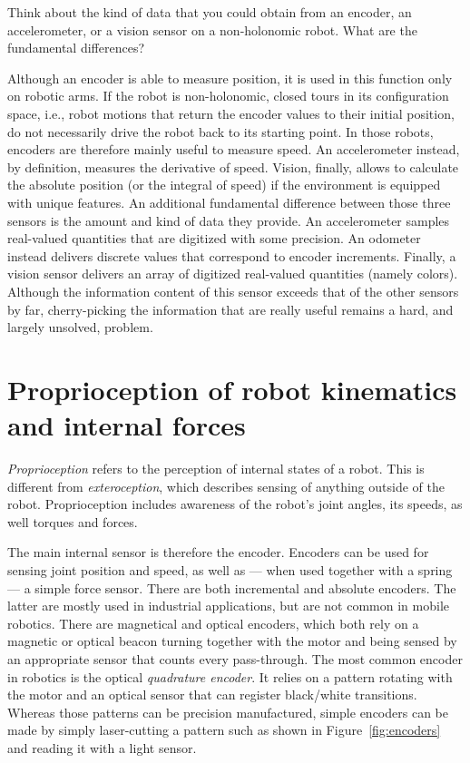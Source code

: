 \begin{framed}
Think about the kind of data that you could obtain from an encoder, an accelerometer, or a vision sensor on a non-holonomic robot. What are the fundamental differences?
\end{framed}
Although an encoder is able to measure position, it is used in this function only on robotic arms. If the robot is non-holonomic, closed tours in its configuration space, i.e., robot motions that return the encoder values to their initial position, do not necessarily drive the robot back to its starting point. In those robots, encoders are therefore mainly useful to measure speed. An accelerometer instead, by definition, measures the derivative of speed. Vision, finally, allows to calculate the absolute position (or the integral of speed) if the environment is equipped with unique features. An additional fundamental difference between those three sensors is the amount and kind of data they provide. An accelerometer samples real-valued quantities that are digitized with some precision. An odometer instead delivers discrete values that correspond to encoder increments. Finally, a vision sensor delivers an array of digitized real-valued quantities (namely colors). Although the information content of this sensor exceeds that of the other sensors by far, cherry-picking the information that are really useful remains a hard, and largely unsolved, problem.


\section{Proprioception of robot kinematics and internal forces}\label{sec:sensors:encoders}
\emph{Proprioception}  refers to the perception of internal states of a robot.
This is different from \emph{exteroception}, which describes sensing of anything outside of the robot. Proprioception includes awareness of the robot's joint angles, its speeds, as well torques and forces.

The main internal sensor is therefore the encoder. Encoders can be used for sensing joint position and speed, as well as --- when used together with a spring --- a simple force sensor. There are both incremental and absolute encoders. The latter are mostly used in industrial applications, but are not common in mobile robotics. There are magnetical and optical encoders, which both rely on a magnetic or optical beacon turning together with the motor and being sensed by an appropriate sensor that counts every pass-through. The most common encoder in robotics is the optical \emph{quadrature encoder}.  It relies on a pattern rotating with the motor and an optical sensor that can register black/white transitions. Whereas those patterns can be precision manufactured, simple encoders can be made by simply laser-cutting a pattern such as shown in Figure~\ref{fig:encoders} and reading it with a light sensor.


